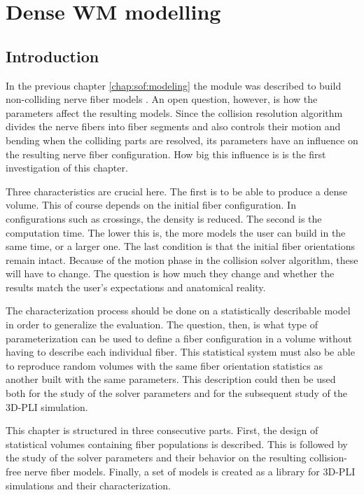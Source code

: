 \setcounter{chapter}{6}
\chapter{Dense \acs{WM} modelling}
\label{cha:model_analysis}
% 
\section{Introduction}
% 
In the previous chapter \cref{chap:sof:modeling} the module  was described to build non-colliding nerve fiber models \cite{Matuschke2019, Matuschke2021}.
An open question, however, is how the parameters affect the resulting models.
Since the collision resolution algorithm divides the nerve fibers into fiber segments and also controls their motion and bending when the colliding parts are resolved, its parameters have an influence on the resulting nerve fiber configuration.
How big this influence is is the first investigation of this chapter.
\par
% 
Three characteristics are crucial here.
The first is to be able to produce a dense volume.
This of course depends on the initial fiber configuration.
In configurations such as crossings, the density is reduced.
The second is the computation time.
The lower this is, the more models the user can build in the same time, or a larger one. 
The last condition is that the initial fiber orientations remain intact.
Because of the motion phase in the collision solver algorithm, these will have to change.
The question is how much they change and whether the results match the user's expectations and anatomical reality.
\par
% 
The characterization process should be done on a statistically describable model in order to generalize the evaluation. The question, then, is what type of parameterization can be used to define a fiber configuration in a volume without having to describe each individual fiber.
This statistical system must also be able to reproduce random volumes with the same fiber orientation statistics as another built with the same parameters.
This description could then be used both for the study of the solver parameters and for the subsequent study of the \ac{3D-PLI} simulation.
\par
% 
This chapter is structured in three consecutive parts.
First, the design of statistical volumes containing fiber populations is described.
This is followed by the study of the solver parameters and their behavior on the resulting collision-free nerve fiber models.
Finally, a set of models is created as a library for \ac{3D-PLI} simulations and their characterization.
% 
% 
% 
